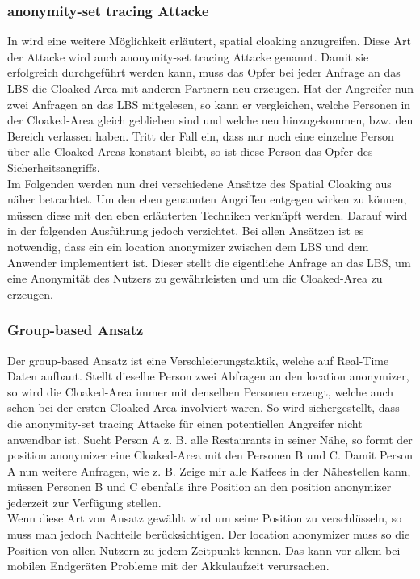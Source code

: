 \subsubsection{anonymity-set tracing Attacke} 
In \cite{chow2007} wird eine weitere Möglichkeit erläutert, spatial cloaking anzugreifen. Diese Art der Attacke wird auch anonymity-set tracing Attacke genannt. Damit sie erfolgreich durchgeführt werden kann, muss das Opfer bei jeder Anfrage an das LBS die Cloaked-Area mit anderen Partnern neu erzeugen. Hat der Angreifer nun zwei Anfragen an das LBS mitgelesen, so kann er vergleichen, welche Personen in der Cloaked-Area gleich geblieben sind und welche neu hinzugekommen, bzw. den Bereich verlassen haben. Tritt der Fall ein, dass nur noch eine einzelne Person über alle Cloaked-Areas konstant bleibt, so ist diese Person das Opfer des Sicherheitsangriffs.\\ 

Im Folgenden werden nun drei verschiedene Ansätze des Spatial Cloaking aus \cite{Chow2011} näher betrachtet. Um den eben genannten Angriffen entgegen wirken zu können, müssen diese mit den eben erläuterten Techniken verknüpft werden. Darauf wird in der folgenden Ausführung jedoch verzichtet. Bei allen Ansätzen ist es notwendig, dass ein ein location anonymizer zwischen dem LBS und dem Anwender implementiert ist. Dieser stellt die eigentliche Anfrage an das LBS, um eine Anonymität des Nutzers zu gewährleisten und um die Cloaked-Area zu erzeugen. 
\subsubsection{Group-based Ansatz} 
Der group-based Ansatz ist eine Verschleierungstaktik, welche auf Real-Time Daten aufbaut. Stellt dieselbe Person zwei Abfragen an den location anonymizer, so wird die Cloaked-Area immer mit denselben Personen erzeugt, welche auch schon bei der ersten Cloaked-Area involviert waren. So wird sichergestellt, dass die anonymity-set tracing Attacke für einen potentiellen Angreifer nicht anwendbar ist. Sucht Person A z. B. alle Restaurants in seiner Nähe, so formt der position anonymizer eine Cloaked-Area mit den Personen B und C. Damit Person A nun weitere Anfragen, wie z. B. \glqq Zeige mir alle Kaffees in der Nähe\grqq stellen kann, müssen Personen B und C ebenfalls ihre Position an den position anonymizer jederzeit zur Verfügung stellen. \\Wenn diese Art von Ansatz gewählt wird um seine Position zu verschlüsseln, so muss man jedoch Nachteile berücksichtigen. Der location anonymizer muss so die Position von allen Nutzern zu jedem Zeitpunkt kennen. Das kann vor allem bei mobilen Endgeräten Probleme mit der Akkulaufzeit verursachen.  
